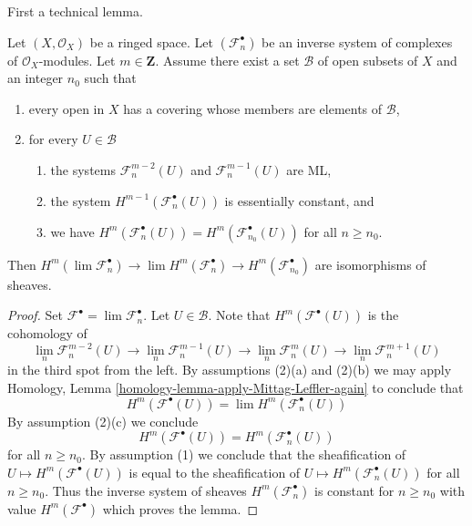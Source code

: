 \noindent
First a technical lemma.

\begin{lemma}
\label{lemma-inverse-limit-complexes}
Let $(X, \mathcal{O}_X)$ be a ringed space. Let $(\mathcal{F}_n^\bullet)$
be an inverse system of complexes of $\mathcal{O}_X$-modules.
Let $m \in \mathbf{Z}$. Assume there exist a set $\mathcal{B}$
of open subsets of $X$ and an integer $n_0$ such that
\begin{enumerate}
\item every open in $X$ has a covering whose members are
elements of $\mathcal{B}$,
\item for every $U \in \mathcal{B}$
\begin{enumerate}
\item the systems
$\mathcal{F}_n^{m - 2}(U)$ and $\mathcal{F}_n^{m - 1}(U)$ are ML,
\item the system $H^{m - 1}(\mathcal{F}_n^\bullet(U))$ is essentially
constant, and
\item we have
$H^m(\mathcal{F}_n^\bullet(U)) = H^m(\mathcal{F}_{n_0}^\bullet(U))$
for all $n \geq n_0$.
\end{enumerate}
\end{enumerate}
Then
$H^m(\lim \mathcal{F}_n^\bullet) \to \lim H^m(\mathcal{F}_n^\bullet) \to
H^m(\mathcal{F}_{n_0}^\bullet)$
are isomorphisms of sheaves.
\end{lemma}

\begin{proof}
Set $\mathcal{F}^\bullet = \lim \mathcal{F}_n^\bullet$. Let
$U \in \mathcal{B}$. Note that $H^m(\mathcal{F}^\bullet(U))$ is the
cohomology of
$$
\lim_n \mathcal{F}_n^{m - 2}(U) \to
\lim_n \mathcal{F}_n^{m - 1}(U) \to
\lim_n \mathcal{F}_n^m(U) \to
\lim_n \mathcal{F}_n^{m + 1}(U)
$$
in the third spot from the left. By assumptions (2)(a) and (2)(b)
we may apply
Homology, Lemma \ref{homology-lemma-apply-Mittag-Leffler-again}
to conclude that
$$
H^m(\mathcal{F}^\bullet(U)) = \lim H^m(\mathcal{F}_n^\bullet(U))
$$
By assumption (2)(c) we conclude
$$
H^m(\mathcal{F}^\bullet(U)) = H^m(\mathcal{F}_n^\bullet(U))
$$
for all $n \geq n_0$. By assumption (1) we conclude that the sheafification of
$U \mapsto H^m(\mathcal{F}^\bullet(U))$ is equal to the sheafification
of $U \mapsto H^m(\mathcal{F}_n^\bullet(U))$ for all $n \geq n_0$.
Thus the inverse system of sheaves $H^m(\mathcal{F}_n^\bullet)$ is
constant for $n \geq n_0$ with value $H^m(\mathcal{F}^\bullet)$ which
proves the lemma.
\end{proof}

